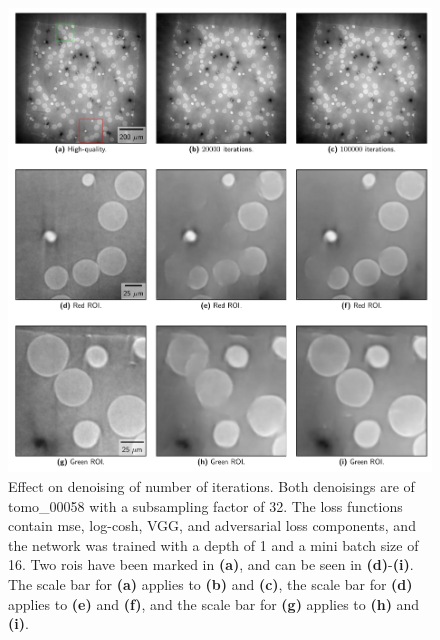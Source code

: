 \begin{figure}[htbp]
  \centering
  \includegraphics[width=.85\textwidth]{figures/iterationdenoisingcomparison.pdf}
  \caption[Effect on denoising of number of iterations]{Effect on denoising of number of iterations. Both denoisings are of tomo\_00058 with a subsampling factor of 32. The loss functions contain \acrshort{mse}, log-cosh, VGG, and adversarial loss components, and the network was trained with a depth of 1 and a mini batch size of 16. Two \acrshort{roi}s have been marked in \textbf{(a)}, and can be seen in \textbf{(d)}-\textbf{(i)}. The scale bar for \textbf{(a)} applies to \textbf{(b)} and \textbf{(c)}, the scale bar for \textbf{(d)} applies to \textbf{(e)} and \textbf{(f)}, and the scale bar for \textbf{(g)} applies to \textbf{(h)} and \textbf{(i)}. }
  \label{fig:iterationdenoisingcomparison}
\end{figure}

